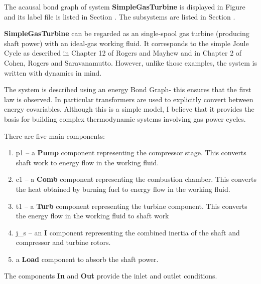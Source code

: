 

   The acausal bond graph of system \textbf{SimpleGasTurbine} is
   displayed in Figure  and its label
   file is listed in Section .
   The subsystems are listed in Section .
   
   \textbf{SimpleGasTurbine} can be regarded as an single-spool gas
   turbine (producing shaft power) with an ideal-gas working fluid. It
   corresponds to the simple Joule Cycle as described in Chapter 12 of
   Rogers and Mayhew and in Chapter 2 of Cohen, Rogers and
   Saravanamutto. However, unlike those examples, the system is
   written with dynamics in mind.
   
   The system is described using an energy Bond Graph- this ensures
   that the first law is observed. In particular transformers are used
   to explicitly convert between energy covariables. Although this is
   a simple model, I believe that it provides the basis for building
   complex thermodynamic systems involving gas power cycles.


There are five main components:
\begin{enumerate}
\item p1 -- a \textbf{Pump} component representing the compressor
  stage. This converts shaft work to energy flow in the working fluid.
\item c1 -- a \textbf{Comb} component representing the combustion
  chamber. This converts the heat obtained by burning fuel to energy
  flow in the working fluid.
\item t1 -- a \textbf{Turb} component representing the turbine
  component. This converts the energy flow in the working fluid to
  shaft work
\item j\_s -- an \textbf{I} component representing the combined inertia
  of the shaft and compressor and turbine rotors.
\item a \textbf{Load} component to absorb the shaft power.
\end{enumerate}
The components \textbf{In} and \textbf{Out} provide the inlet and
outlet conditions.

